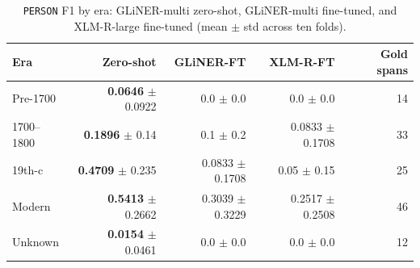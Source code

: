\begin{table}
  \caption{\texttt{PERSON} F1 by era: GLiNER-multi zero-shot, GLiNER-multi fine-tuned, and XLM-R-large fine-tuned (mean $\pm$ std across ten folds).}
  \label{tab:person-per-era}
  \begin{tabular}{lrrrr}
    \toprule
    Era & Zero-shot & GLiNER-FT & XLM-R-FT & Gold spans \\
    \midrule
    Pre-1700 & \textbf{0.0646} $\pm$ 0.0922 & 0.0 $\pm$ 0.0 & 0.0 $\pm$ 0.0 & 14 \\
    1700--1800 & \textbf{0.1896} $\pm$ 0.14 & 0.1 $\pm$ 0.2 & 0.0833 $\pm$ 0.1708 & 33 \\
    19th-c & \textbf{0.4709} $\pm$ 0.235 & 0.0833 $\pm$ 0.1708 & 0.05 $\pm$ 0.15 & 25 \\
    Modern & \textbf{0.5413} $\pm$ 0.2662 & 0.3039 $\pm$ 0.3229 & 0.2517 $\pm$ 0.2508 & 46 \\
    Unknown & \textbf{0.0154} $\pm$ 0.0461 & 0.0 $\pm$ 0.0 & 0.0 $\pm$ 0.0 & 12 \\
    \bottomrule
  \end{tabular}
\end{table}

